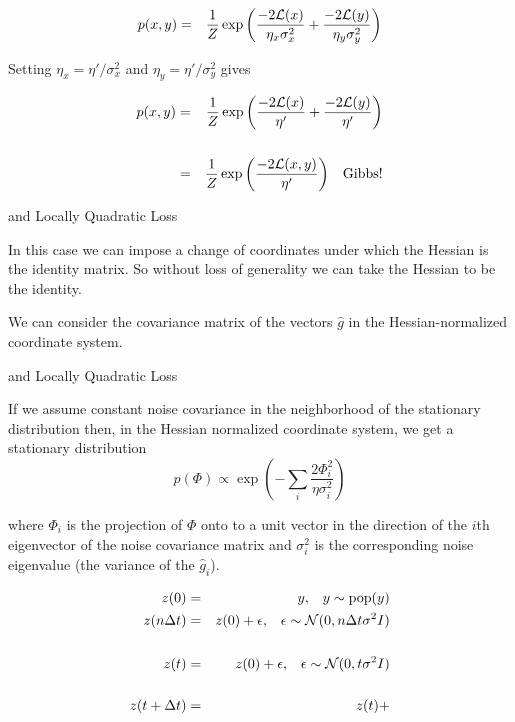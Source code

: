 {\begin{eqnarray*}
p(x,y) & = & \frac{1}{Z} \exp\left(\frac{-2{\cal L}(x)}{ \eta_x \sigma_x^2} + \frac{-2{\cal L}(y)}{\eta_y \sigma_y^2}\right)
\end{eqnarray*}

Setting $\eta_x = \eta'/\sigma^2_x$ and $\eta_y = \eta'/\sigma^2_y$ gives

\begin{eqnarray*}
p(x,y) & = & \frac{1}{Z} \exp\left(\frac{-2{\cal L}(x)}{ \eta'} + \frac{-2{\cal L}(y)}{\eta'}\right) \\
\\
& = & \frac{1}{Z} \exp\left(\frac{-2{\cal L}(x,y)}{\eta'}\right)\;\;\;\mathrm{Gibbs!}
\end{eqnarray*}

{and Locally Quadratic Loss}

In this case we can impose a change of coordinates under which the Hessian is the identity matrix.  So without loss of generality we can take the
Hessian to be the identity.

\vfill
We can consider the covariance matrix of the vectors $\hat{g}$ in the Hessian-normalized coordinate system.

{and Locally Quadratic Loss}

If we assume constant noise covariance in the neighborhood of the stationary distribution then, in the Hessian normalized
coordinate system, we get a stationary distribution
$$p(\Phi) \propto \exp\left(-\sum_i \frac{2{\Phi_i^2}}{\eta\sigma_i^2}\right)$$

\vfill
where $\Phi_i$ is the projection of $\Phi$ onto to a unit vector in the direction of the $i$th eigenvector of the noise covariance matrix and $\sigma^2_i$
is the corresponding noise eigenvalue (the variance of the $\hat{g}_i$).


\begin{eqnarray*}
  z(0) & = & y,\;\;\;y \sim \mathrm{pop}(y) \nonumber \\
  z(n\Delta t) & = & z(0) + \epsilon,\;\;\;\epsilon \sim {\cal N}(0,n\Delta t\sigma^2I) \\
  \\
  z(t) & = & z(0) + \epsilon,\;\;\;\epsilon \sim {\cal N}(0,t\sigma^2I) \\
  \\
  z(t+ \Delta t) & = & z(t) + 
\end{eqnarray*}




}
